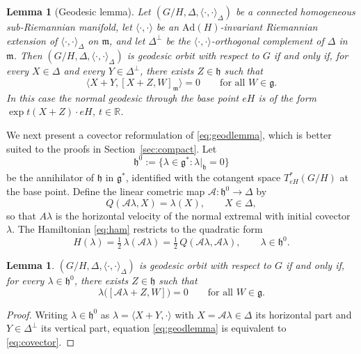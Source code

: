 \documentclass[12pt]{amsart}
\theoremstyle{plain}
\newtheorem{lemma}[theorem]{Lemma}
\theoremstyle{definition}
\theoremstyle{remark}
\newcommand{\alg}[1]{\mathfrak{#1}}
\newcommand{\RR}{\mathbb{R}}
\begin{document}
\begin{lemma}[Geodesic lemma]\label{lem:geod}
Let $(G/H,\Delta,\langle\cdot,\cdot\rangle_\Delta)$ be a connected homogeneous sub-Riemannian
manifold, let $\langle\cdot,\cdot\rangle$ be an $\mathrm{Ad}(H)$-invariant Riemannian extension of
$\langle\cdot,\cdot\rangle_\Delta$ on $\alg{m}$, and let $\Delta^{\perp}$ be the
$\langle\cdot,\cdot\rangle$-orthogonal complement of $\Delta$ in $\alg{m}$. Then
$(G/H,\Delta,\langle\cdot,\cdot\rangle_\Delta)$ is geodesic orbit with respect to $G$ if and only
if, for every $X\in\Delta$ and every $Y\in\Delta^{\perp}$, there exists $Z\in\alg{h}$ such that
\begin{equation}\label{eq:geodlemma}
\langle X+Y,[X+Z,W]_{\alg{m}}\rangle=0\qquad\text{for all }W\in\alg{g}.
\end{equation}
In this case the normal geodesic through the base point $eH$ is of the form
$\exp t(X+Z)\cdot eH$, $t\in\RR$.
\end{lemma}

We next present a covector reformulation of \eqref{eq:geodlemma}, which is better suited to the
proofs in Section~\ref{sec:compact}. Let
\[ \alg{h}^0:=\{\lambda\in\alg{g}^*:\lambda|_{\alg{h}}=0\} \]
be the annihilator of $\alg{h}$ in $\alg{g}^*$, identified with the cotangent space
$T^*_{eH}(G/H)$ at the base point. Define the linear cometric map $\mathcal{A}:\alg{h}^0\to\Delta$ by
\begin{equation}\label{eq:cometric}
Q(\mathcal{A}\lambda,X)=\lambda(X),\qquad X\in\Delta,
\end{equation}
so that $A\lambda$ is the horizontal velocity of the normal extremal with initial covector
$\lambda$. The Hamiltonian \eqref{eq:ham} restricts to the quadratic form
\[ H(\lambda)=\tfrac12\,\lambda(\mathcal{A}\lambda)=\tfrac12\,Q(\mathcal{A}\lambda,\mathcal{A}\lambda),\qquad
\lambda\in\alg{h}^0. \]

\begin{lemma}\label{lem:covector}
$(G/H,\Delta,\langle\cdot,\cdot\rangle_\Delta)$ is geodesic orbit with respect to $G$ if and only
if, for every $\lambda\in\alg{h}^0$, there exists $Z\in\alg{h}$ such that
\begin{equation}\label{eq:covector}
\lambda\big([\mathcal{A}\lambda+Z,W]\big)=0\qquad\text{for all }W\in\alg{g}.
\end{equation}
\end{lemma}

\begin{proof}
Writing $\lambda\in\alg{h}^0$ as $\lambda=\langle X+Y,\cdot\rangle$ with $X=\mathcal{A}\lambda\in\Delta$
its horizontal part and $Y\in\Delta^{\perp}$ its vertical part, equation \eqref{eq:geodlemma} is
equivalent to \eqref{eq:covector}.
\end{proof}
\end{document}

